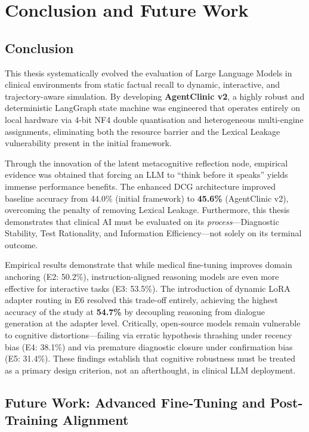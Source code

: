 \chapter{Conclusion and Future Work}
\label{Chapter8}

\section{Conclusion}

This thesis systematically evolved the evaluation of Large Language Models in clinical environments from static factual recall to dynamic, interactive, and trajectory-aware simulation. By developing \textbf{AgentClinic v2}, a highly robust and deterministic LangGraph state machine was engineered that operates entirely on local hardware via 4-bit NF4 double quantisation and heterogeneous multi-engine assignments, eliminating both the resource barrier and the Lexical Leakage vulnerability present in the initial framework.

Through the innovation of the latent metacognitive reflection node, empirical evidence was obtained that forcing an LLM to ``think before it speaks'' yields immense performance benefits. The enhanced DCG architecture improved baseline accuracy from 44.0\% (initial framework) to \textbf{45.6\%} (AgentClinic v2), overcoming the penalty of removing Lexical Leakage. Furthermore, this thesis demonstrates that clinical AI must be evaluated on its \textit{process}---Diagnostic Stability, Test Rationality, and Information Efficiency---not solely on its terminal outcome.

Empirical results demonstrate that while medical fine-tuning improves domain anchoring (E2: 50.2\%), instruction-aligned reasoning models are even more effective for interactive tasks (E3: 53.5\%). The introduction of dynamic LoRA adapter routing in E6 resolved this trade-off entirely, achieving the highest accuracy of the study at \textbf{54.7\%} by decoupling reasoning from dialogue generation at the adapter level. Critically, open-source models remain vulnerable to cognitive distortions---failing via erratic hypothesis thrashing under recency bias (E4: 38.1\%) and via premature diagnostic closure under confirmation bias (E5: 31.4\%). These findings establish that cognitive robustness must be treated as a primary design criterion, not an afterthought, in clinical LLM deployment.

\section{Future Work: Advanced Fine-Tuning and Post-Training Alignment}

